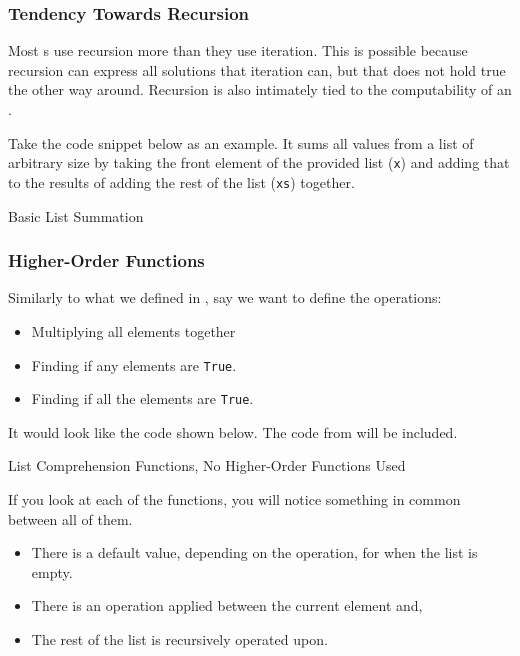 \subsubsection{Tendency Towards Recursion}\label{subsubsec:Tendency_Recursion}
Most s use recursion more than they use iteration.
This is possible because recursion can express all solutions that iteration can, but that does not hold true the other way around.
Recursion is also intimately tied to the computability of an .

Take the code snippet below as an example.
It sums all values from a list of arbitrary size by taking the front element of the provided list (\texttt{x}) and adding that to the results of adding the rest of the list (\texttt{xs}) together.

\begin{listing}[h!tbp]
\caption{Basic List Summation}
\label{lst:Recursion_List_Summation}
\end{listing}

\subsubsection{Higher-Order Functions}\label{subsubsec:Higher_Order_Functions}
Similarly to what we defined in , say we want to define the operations:
\begin{itemize}[noitemsep]
\item Multiplying all elements together
\item Finding if any elements are \texttt{True}.
\item Finding if all the elements are \texttt{True}.
\end{itemize}

It would look like the code shown below.
The code from  will be included.
\begin{listing}[h!tbp]
\caption{List Comprehension Functions, No Higher-Order Functions Used}
\label{lst:Many_Funcs_No_Higher_Order}
\end{listing}

If you look at each of the functions, you will notice something in common between all of them.
\begin{itemize}[noitemsep]
\item There is a default value, depending on the operation, for when the list is empty.
\item There is an operation applied between the current element and,
\item The rest of the list is recursively operated upon.
\end{itemize}

